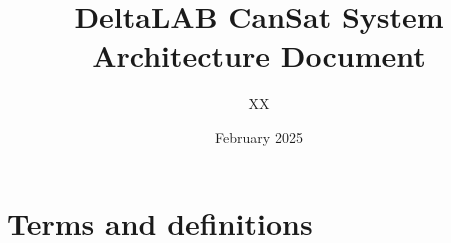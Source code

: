 \documentclass{article}
\title{DeltaLAB CanSat System Architecture Document}
\author{XX}
\date{February 2025}
\begin{document}
\maketitle

\section{Terms and definitions}
\end{document}
